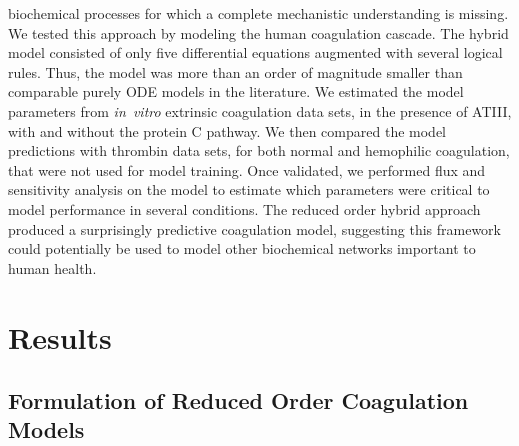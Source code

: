 \documentclass[processes,article,received,moreauthors,pdftex,12pt,a4paper]{mdpi}
\begin{document}
biochemical processes for which a complete mechanistic understanding is missing. 
We tested this approach by modeling the human coagulation cascade. 
The hybrid model consisted of only five differential equations augmented with several logical rules.
Thus, the model was more than an order of magnitude smaller than comparable purely ODE models in the literature.
We estimated the model parameters from \textit{in~vitro} extrinsic coagulation data sets, in the presence of ATIII, with and without the protein C pathway. 
We then compared the model predictions with thrombin data sets, for both normal and hemophilic coagulation, that were not used for model training.
Once validated, we performed flux and sensitivity analysis on the model to estimate which parameters were critical to model performance in several conditions. 
The reduced order hybrid approach produced a surprisingly predictive coagulation model, 
suggesting this framework could potentially be used to model other biochemical networks important to human health. 



\section{Results}


\subsection{Formulation of Reduced Order Coagulation Models}
\end{document}
